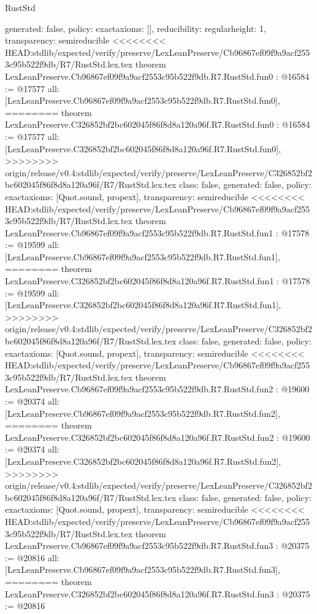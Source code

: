 \begin{lexlean}{RustStd}
\begin{coremodule}
{\begin{coremodule}
{{{  generated: false,
  policy: exact{axioms: []},
  reducibility: regular{height: 1},
  transparency: semireducible
}
<<<<<<<< HEAD:stdlib/expected/verify/preserve/LexLeanPreserve/Cb96867ef09f9a9acf2553c95b522f9db/R7/RustStd.lex.tex
theorem LexLeanPreserve.Cb96867ef09f9a9acf2553c95b522f9db.R7.RustStd.fun0 : @16584 := @17577 {
  all: [LexLeanPreserve.Cb96867ef09f9a9acf2553c95b522f9db.R7.RustStd.fun0],
========
theorem LexLeanPreserve.C326852bf2bc602045f86f8d8a120a96f.R7.RustStd.fun0 : @16584 := @17577 {
  all: [LexLeanPreserve.C326852bf2bc602045f86f8d8a120a96f.R7.RustStd.fun0],
>>>>>>>> origin/release/v0.4:stdlib/expected/verify/preserve/LexLeanPreserve/C326852bf2bc602045f86f8d8a120a96f/R7/RustStd.lex.tex
  class: false,
  generated: false,
  policy: exact{axioms: [Quot.sound, propext]},
  transparency: semireducible
}
<<<<<<<< HEAD:stdlib/expected/verify/preserve/LexLeanPreserve/Cb96867ef09f9a9acf2553c95b522f9db/R7/RustStd.lex.tex
theorem LexLeanPreserve.Cb96867ef09f9a9acf2553c95b522f9db.R7.RustStd.fun1 : @17578 := @19599 {
  all: [LexLeanPreserve.Cb96867ef09f9a9acf2553c95b522f9db.R7.RustStd.fun1],
========
theorem LexLeanPreserve.C326852bf2bc602045f86f8d8a120a96f.R7.RustStd.fun1 : @17578 := @19599 {
  all: [LexLeanPreserve.C326852bf2bc602045f86f8d8a120a96f.R7.RustStd.fun1],
>>>>>>>> origin/release/v0.4:stdlib/expected/verify/preserve/LexLeanPreserve/C326852bf2bc602045f86f8d8a120a96f/R7/RustStd.lex.tex
  class: false,
  generated: false,
  policy: exact{axioms: [Quot.sound, propext]},
  transparency: semireducible
}
<<<<<<<< HEAD:stdlib/expected/verify/preserve/LexLeanPreserve/Cb96867ef09f9a9acf2553c95b522f9db/R7/RustStd.lex.tex
theorem LexLeanPreserve.Cb96867ef09f9a9acf2553c95b522f9db.R7.RustStd.fun2 : @19600 := @20374 {
  all: [LexLeanPreserve.Cb96867ef09f9a9acf2553c95b522f9db.R7.RustStd.fun2],
========
theorem LexLeanPreserve.C326852bf2bc602045f86f8d8a120a96f.R7.RustStd.fun2 : @19600 := @20374 {
  all: [LexLeanPreserve.C326852bf2bc602045f86f8d8a120a96f.R7.RustStd.fun2],
>>>>>>>> origin/release/v0.4:stdlib/expected/verify/preserve/LexLeanPreserve/C326852bf2bc602045f86f8d8a120a96f/R7/RustStd.lex.tex
  class: false,
  generated: false,
  policy: exact{axioms: [Quot.sound, propext]},
  transparency: semireducible
}
<<<<<<<< HEAD:stdlib/expected/verify/preserve/LexLeanPreserve/Cb96867ef09f9a9acf2553c95b522f9db/R7/RustStd.lex.tex
theorem LexLeanPreserve.Cb96867ef09f9a9acf2553c95b522f9db.R7.RustStd.fun3 : @20375 := @20816 {
  all: [LexLeanPreserve.Cb96867ef09f9a9acf2553c95b522f9db.R7.RustStd.fun3],
========
theorem LexLeanPreserve.C326852bf2bc602045f86f8d8a120a96f.R7.RustStd.fun3 : @20375 := @20816 {
}}}}}}}
\end{coremodule}}
\end{coremodule}
\end{lexlean}
